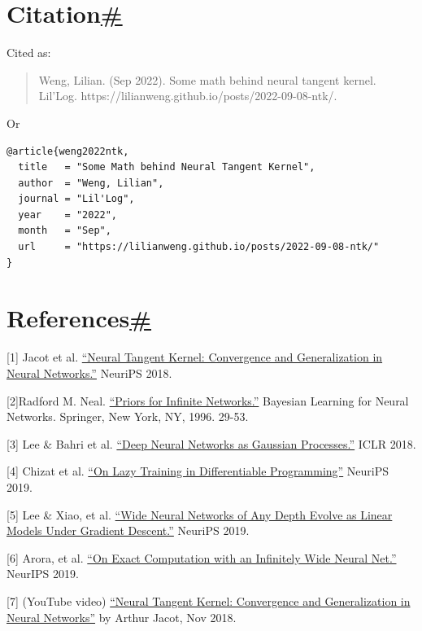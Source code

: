 \section{\texorpdfstring{Citation\hyperref[citation]{\#}}{Citation\#}}\label{citation}

Cited as:

\begin{quote}
Weng, Lilian. (Sep 2022). Some math behind neural tangent kernel. Lil'Log. https://lilianweng.github.io/posts/2022-09-08-ntk/.
\end{quote}

Or

\begin{verbatim}
@article{weng2022ntk,
  title   = "Some Math behind Neural Tangent Kernel",
  author  = "Weng, Lilian",
  journal = "Lil'Log",
  year    = "2022",
  month   = "Sep",
  url     = "https://lilianweng.github.io/posts/2022-09-08-ntk/"
}
\end{verbatim}

\section{\texorpdfstring{References\hyperref[references]{\#}}{References\#}}\label{references}

{[}1{]} Jacot et al. \href{https://arxiv.org/abs/1806.07572}{``Neural Tangent Kernel: Convergence and Generalization in Neural Networks.''} NeuriPS 2018.

{[}2{]}Radford M. Neal. \href{}{``Priors for Infinite Networks.''} Bayesian Learning for Neural Networks. Springer, New York, NY, 1996. 29-53.

{[}3{]} Lee \& Bahri et al. \href{https://arxiv.org/abs/1711.00165}{``Deep Neural Networks as Gaussian Processes.''} ICLR 2018.

{[}4{]} Chizat et al. \href{https://arxiv.org/abs/1812.07956}{``On Lazy Training in Differentiable Programming''} NeuriPS 2019.

{[}5{]} Lee \& Xiao, et al. \href{https://arxiv.org/abs/1902.06720}{``Wide Neural Networks of Any Depth Evolve as Linear Models Under Gradient Descent.''} NeuriPS 2019.

{[}6{]} Arora, et al. \href{https://arxiv.org/abs/1904.11955}{``On Exact Computation with an Infinitely Wide Neural Net.''} NeurIPS 2019.

{[}7{]} (YouTube video) \href{https://www.youtube.com/watch?v=raT2ECrvbag}{``Neural Tangent Kernel: Convergence and Generalization in Neural Networks''} by Arthur Jacot, Nov 2018.

